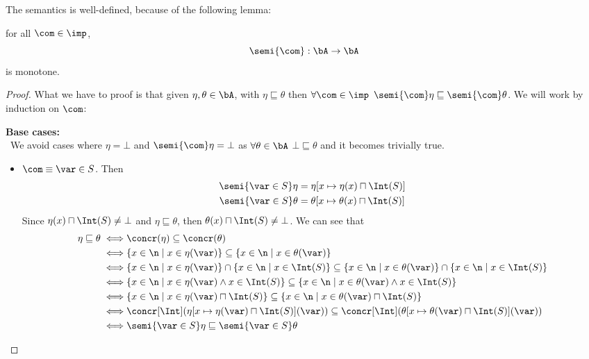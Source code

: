 The semantics is well-defined, because of the following lemma:

\begin{lemma}\label{le:monotone}
  for all \(\com \in \imp\), \[\semi{\com}: \bA \to \bA\] is
  monotone.
\end{lemma}

\begin{proof}
  What we have to proof is that given \(\eta, \theta \in \bA\), with
  \(\eta \sqsubseteq \theta\) then \(\forall \com \in \imp\)
  \(\semi{\com}\eta \sqsubseteq \semi{\com}\theta\). We will work by
  induction on \(\com\):
  
  \noindent
  \textbf{Base cases:}\ \\ \ We avoid cases where \(\eta = \bot\) and
  \(\semi{\com}\eta = \bot\) as \(\forall \theta \in \bA\) \(\bot
  \sqsubseteq \theta\) and it becomes trivially true.
  \begin{itemize}
  \item \(\com \equiv \var \in S\). Then
    \begin{align*}
      \semi{\var \in S}\eta & = \eta[x\mapsto\eta(x) \sqcap \Int(S)] \\
      \semi{\var \in S}\theta & = \theta[x\mapsto \theta(x) \sqcap \Int(S)]
    \end{align*}
    Since \(\eta(x) \sqcap \Int(S) \neq \bot\) and \(\eta \sqsubseteq
    \theta\), then \(\theta(x) \sqcap \Int(S) \neq \bot\). We can see
    that
    \begin{align*}
      \eta \sqsubseteq \theta \iff & \concr(\eta) \subseteq \concr(\theta) \\
      \iff & \{x\in\n \mid x \in \eta(\var)\} \subseteq \{x\in\n \mid x \in \theta(\var)\} \\
      \iff & \{x\in\n \mid x \in \eta(\var)\} \cap \{x \in \n \mid x \in \Int(S)\} \subseteq \{x\in\n \mid x \in \theta(\var)\} \cap \{x \in \n \mid x \in \Int(S)\} \\
      \iff & \{x \in \n \mid x \in \eta(\var) \wedge x \in \Int(S)\} \subseteq \{x \in \n \mid x \in \theta(\var) \wedge x \in \Int(S)\} \\
      \iff & \{x \in \n \mid x \in \eta(\var) \sqcap \Int(S)\} \subseteq \{x \in \n \mid x \in \theta(\var) \sqcap \Int(S)\} \\
      \iff & \concr[\Int](\eta[x\mapsto \eta(\var) \sqcap \Int(S)](\var)) \subseteq \concr[\Int](\theta[x\mapsto \theta(\var) \sqcap \Int(S)](\var)) \\
      \iff & \semi{\var \in S}\eta \sqsubseteq \semi{\var \in S}\theta

\end{align*}
\end{itemize}
\end{proof}
